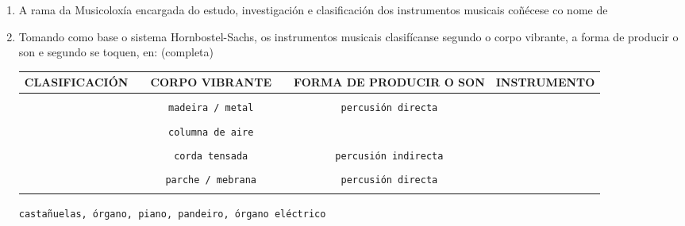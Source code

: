 % 
%



\begin{ejercicio}
 \begin{enumerate}[1)]
  \item 
    A rama da Musicoloxía encargada do estudo, investigación e clasificación dos instrumentos musicais coñécese co nome de \dotfill
  \item
    Tomando como base o sistema Hornbostel-Sachs, os instrumentos musicais clasifícanse segundo o corpo vibrante, a forma de producir o son e segundo se toquen, en: (completa)

    \par
    \begin{center}
   \begin{tabular}{llclcc}
   {\scriptsize{\textsf{CLASIFICACIÓN}}} & & {\scriptsize{\textsf{CORPO VIBRANTE}}} & & {\scriptsize{\textsf{FORMA DE PRODUCIR O SON}}} &  {\scriptsize{\textsf{INSTRUMENTO}}} \\
   \hline
   & & & & & \\
   \dotfill & & \small{\texttt{madeira / metal}} & & \small{\texttt{percusión directa}} & \dotfill \\
   & & & & &\\
   \dotfill & & \small{\texttt{columna de aire}} & & \dotfill & \dotfill \\   
   & & & & &\\
   \dotfill & & \small{\texttt{corda tensada}} & & \small{\texttt{percusión indirecta}} & \dotfill \\
   & & & & &\\
   \dotfill & & \small{\texttt{parche / mebrana}} & & \small{\texttt{percusión directa}} & \dotfill \\   
   & & & & &\\
   \hline
    \end{tabular}
    \end{center}
    \begin{center}
    {\small\texttt{castañuelas, órgano, piano, pandeiro, órgano eléctrico}}     
    \end{center}    
  \end{enumerate}
\end{ejercicio}



